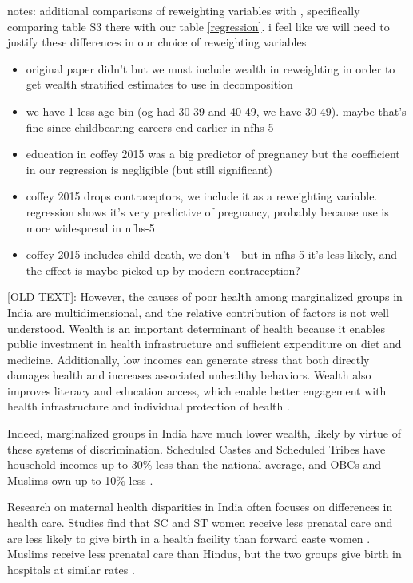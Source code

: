 notes: additional comparisons of reweighting variables with \cite{coffey2015prepregnancy}, specifically comparing table S3 there with our table \ref{regression}. i feel like we will need to justify these differences in our choice of reweighting variables
\begin{itemize}
    \item original paper didn't but we must include wealth in reweighting in order to get wealth stratified estimates to use in decomposition
    \item we have 1 less age bin (og had 30-39 and 40-49, we have 30-49). maybe that's fine since childbearing careers end earlier in nfhs-5
    \item  education in coffey 2015 was a big predictor of pregnancy but the coefficient in our regression is negligible (but still significant)
    \item coffey 2015 drops contraceptors, we include it as a reweighting variable. regression shows it's very predictive of pregnancy, probably because use is more widespread in nfhs-5
    \item coffey 2015 includes child death, we don't - but in nfhs-5 it's less likely, and the effect is maybe picked up by modern contraception? 
\end{itemize}




[OLD TEXT]:
However, the causes of poor health among marginalized groups in India are multidimensional, and the relative contribution of factors is not well understood. Wealth is an important determinant of health because it enables public investment in health infrastructure and sufficient expenditure on diet and medicine. Additionally, low incomes can generate stress that both directly damages health and increases associated unhealthy behaviors. Wealth also improves literacy and education access, which enable better engagement with health infrastructure and individual protection of health \citep{rajan2013wealthier}. 

Indeed, marginalized groups in India have much lower wealth, likely by virtue of these systems of discrimination. Scheduled Castes and Scheduled Tribes have household incomes up to 30\% less than the national average, and OBCs and Muslims own up to 10\% less \citep{bharti2018wealth}.




Research on maternal health disparities in India often focuses on differences in health care.  Studies find that SC and ST women receive less prenatal care and are less likely to give birth in a health facility than forward caste women \citep{dommaraju2008pervasive, kumar2016explaining, das2022caste}.  Muslims receive less prenatal care than Hindus, but the two groups give birth in hospitals at similar rates \citep{bango2024pattern, ohlan2020muslim}.

